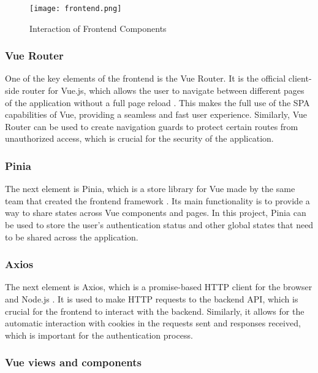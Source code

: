 \begin{figure}[htbp]
    \centering
    \texttt{[image: frontend.png]}
    \caption{Interaction of Frontend Components}
    \label{fig:frontend}
\end{figure}

\FloatBarrier
\subsubsection{Vue Router}

One of the key elements of the frontend is the Vue Router. It is the official client-side router for Vue.js, which allows the user to navigate between different pages of the application without a full page reload \parencite{vuerouter}. This makes the full use of the SPA capabilities of Vue, providing a seamless and fast user experience. Similarly, Vue Router can be used to create navigation guards to protect certain routes from unauthorized access, which is crucial for the security of the application.

\subsubsection{Pinia}

The next element is Pinia, which is a store library for Vue made by the same team that created the frontend framework \parencite{pinia}. Its main functionality is to provide a way to share states across Vue components and pages. In this project, Pinia can be used to store the user's authentication status and other global states that need to be shared across the application.

\subsubsection{Axios}

The next element is Axios, which is a promise-based HTTP client for the browser and Node.js \parencite{axios}. It is used to make HTTP requests to the backend API, which is crucial for the frontend to interact with the backend. Similarly, it allows for the automatic interaction with cookies in the requests sent and responses received, which is important for the authentication process.

\subsubsection{Vue views and components}

